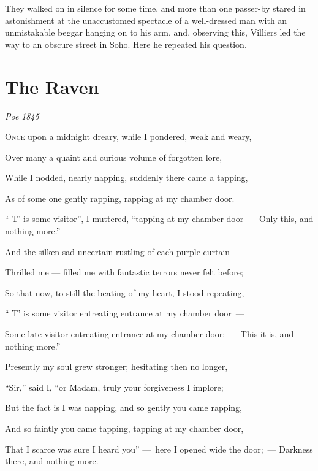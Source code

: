 \documentclass[openany]{book} %
\begin{document}
\bigskip
They walked on in silence for some time, and more than one passer-by stared in astonishment at the unaccustomed spectacle of a well-dressed man with an unmistakable beggar hanging on to his arm, and, observing this, Villiers led the way to an obscure street in Soho. Here he repeated his question. 

\parag 

\hypertarget{toc7}{}
\pagebreak[\PAGExSUBxBREAKxPOLICY]
\section{The Raven}

\textit{Poe}
\textit{1845}

\bigskip

\par\noindent 

\lettrine[lines=\INITIALxLETTERxSIZE, lhang=0.33, loversize=0.25]{O}{nce} upon a midnight dreary, while I pondered, weak and weary,
\par\noindent Over many a quaint and curious volume of forgotten lore,
\par\noindent While I nodded, nearly napping, suddenly there came a tapping,
\par\noindent As of some one gently rapping, rapping at my chamber door.
\par\noindent “ T’ is some visitor”, I muttered, “tapping at my chamber door~—
    Only this, and nothing more.”

\bigskip
\par\noindent And the silken sad uncertain rustling of each purple curtain
\par\noindent Thrilled me — filled me with fantastic terrors never felt before;
\par\noindent So that now, to still the beating of my heart, I stood repeating,
\par\noindent “ T’ is some visitor entreating entrance at my chamber door~—
\par\noindent Some late visitor entreating entrance at my chamber door;~—
     This it is, and nothing more.”

\bigskip
\par\noindent Presently my soul grew stronger; hesitating then no longer,
\par\noindent “Sir,” said I, “or Madam, truly your forgiveness I implore;
\par\noindent But the fact is I was napping, and so gently you came rapping,
\par\noindent And so faintly you came tapping, tapping at my chamber door,
\par\noindent That I scarce was sure I heard you” —~here I opened wide the door;~—
     Darkness there, and nothing more.
\end{document}
